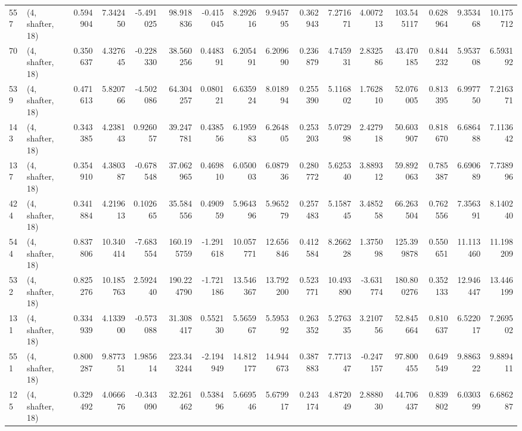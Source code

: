 \begin{tabular}{llrrrrrrrrrrrrrr}
557 &  (4, shafter, 18) &   0.594904 &   7.342450 &  -5.491025 &    98.918836 &  -0.415045 &   8.292616 &   9.945795 &  0.362943 &   7.271671 &   4.007213 &    103.545117 &   0.628964 &    9.353468 &   10.175712 \\
70  &  (4, shafter, 18) &   0.350637 &   4.327645 &  -0.228330 &    38.560256 &   0.448391 &   6.205491 &   6.209690 &  0.236879 &   4.745931 &   2.832586 &     43.470185 &   0.844232 &    5.953708 &    6.593192 \\
539 &  (4, shafter, 18) &   0.471613 &   5.820766 &  -4.502086 &    64.304257 &   0.080121 &   6.635924 &   8.018994 &  0.255390 &   5.116802 &   1.762810 &     52.076005 &   0.813395 &    6.997750 &    7.216371 \\
143 &  (4, shafter, 18) &   0.343385 &   4.238143 &   0.926057 &    39.247781 &   0.438556 &   6.195983 &   6.264805 &  0.253203 &   5.072998 &   2.427918 &     50.603907 &   0.818670 &    6.686488 &    7.113642 \\
137 &  (4, shafter, 18) &   0.354910 &   4.380387 &  -0.678548 &    37.062965 &   0.469810 &   6.050003 &   6.087936 &  0.280772 &   5.625340 &   3.889312 &     59.892063 &   0.785387 &    6.690689 &    7.738996 \\
424 &  (4, shafter, 18) &   0.341884 &   4.219613 &   0.102665 &    35.584556 &   0.490959 &   5.964396 &   5.965279 &  0.257483 &   5.158745 &   3.485258 &     66.263504 &   0.762556 &    7.356391 &    8.140240 \\
544 &  (4, shafter, 18) &   0.837806 &  10.340414 &  -7.683554 &   160.195759 &  -1.291618 &  10.057771 &  12.656846 &  0.412584 &   8.266228 &   1.375098 &    125.399878 &   0.550651 &   11.113460 &   11.198209 \\
532 &  (4, shafter, 18) &   0.825276 &  10.185763 &   2.592440 &   190.224790 &  -1.721186 &  13.546367 &  13.792200 &  0.523771 &  10.493890 &  -3.631774 &    180.800276 &   0.352133 &   12.946447 &   13.446199 \\
131 &  (4, shafter, 18) &   0.334939 &   4.133900 &  -0.573088 &    31.308417 &   0.552130 &   5.565967 &   5.595392 &  0.263352 &   5.276335 &   3.210756 &     52.845664 &   0.810637 &    6.522017 &    7.269502 \\
551 &  (4, shafter, 18) &   0.800287 &   9.877351 &   1.985614 &   223.343244 &  -2.194949 &  14.812177 &  14.944673 &  0.387883 &   7.771347 &  -0.247157 &     97.800455 &   0.649549 &    9.886322 &    9.889411 \\
125 &  (4, shafter, 18) &   0.329492 &   4.066676 &  -0.343090 &    32.261462 &   0.538496 &   5.669546 &   5.679917 &  0.243174 &   4.872049 &   2.888030 &     44.706437 &   0.839802 &    6.030399 &    6.686287 \\

\end{tabular}
